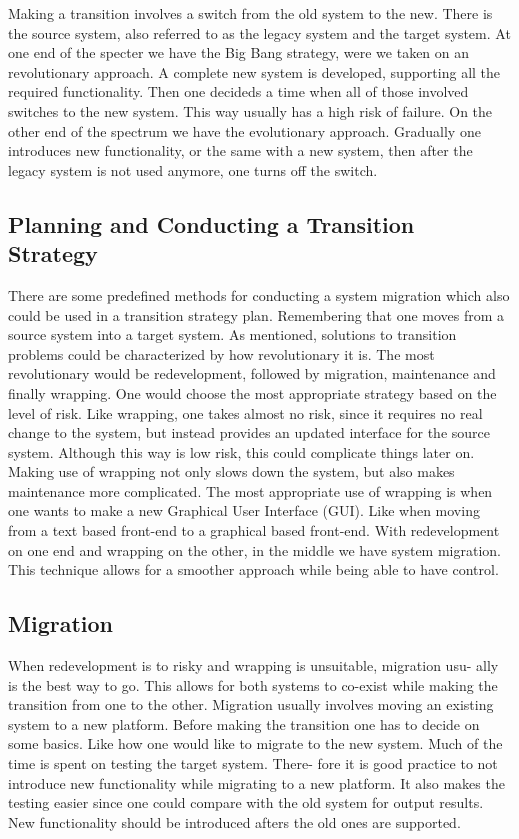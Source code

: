 Making a transition involves a switch from the old system to the new. There
is the source system, also referred to as the legacy system and the target
system. At one end of the specter we have the Big Bang strategy, were we
taken on an revolutionary approach. A complete new system is developed,
supporting all the required functionality. Then one decideds a time when all
of those involved switches to the new system. This way usually has a high
risk of failure. On the other end of the spectrum we have the evolutionary
approach. Gradually one introduces new functionality, or the same with a
new system, then after the legacy system is not used anymore, one turns off
the switch.

\subsection{Planning and Conducting a Transition Strategy}
There are some predefined methods for conducting a system migration which
also could be used in a transition strategy plan. Remembering that one
moves from a source system into a target system. As mentioned, solutions to
transition problems could be characterized by how revolutionary it is. The
most revolutionary would be redevelopment, followed by migration, maintenance and finally wrapping. One would choose the most appropriate strategy based on the level of risk. 
Like wrapping, one takes almost no risk, since it requires no real change to the system, but instead provides an updated interface for the source system. Although this way is low risk, this could complicate things later on. Making use of wrapping not only slows down the system,
but also makes maintenance more complicated. The most appropriate use of
wrapping is when one wants to make a new Graphical User Interface (GUI).
Like when moving from a text based front-end to a graphical based front-end.
With redevelopment on one end and wrapping on the other, in the middle we
have system migration. This technique allows for a smoother approach while
being able to have control.

\subsection{Migration}
When redevelopment is to risky and wrapping is unsuitable, migration usu-
ally is the best way to go. This allows for both systems to co-exist while
making the transition from one to the other. Migration usually involves
moving an existing system to a new platform. Before making the transition
one has to decide on some basics. Like how one would like to migrate to the
new system. Much of the time is spent on testing the target system. There-
fore it is good practice to not introduce new functionality while migrating to
a new platform. It also makes the testing easier since one could compare with
the old system for output results. New functionality should be introduced
afters the old ones are supported.

